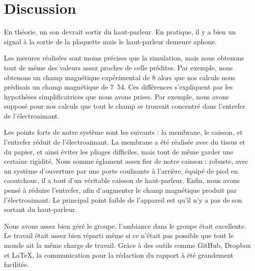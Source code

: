 

\section{Discussion}

En théorie, un son devrait sortir du haut-parleur.  En pratique, il y a bien un signal
à la sortie de la plaquette mais le haut-parleur demeure aphone. 

Les mesures réalisées sont moins précises que la simulation, mais nous obtenons tout de même 
des valeurs assez proches de celle prédites.  Par exemple, nous obtenons un champ magnétique
expérimental de \unit{8}{\centi\tesla} alors que nos calculs nous prédisais un champ magnétique de
\unit{7.54}{\centi\tesla}. Ces différences s'expliquent par les hypothèses simplificatrices
que nous avons prises. Par exemple, nous avons supposé pour nos calculs que tout le champ se trouvait 
concentré dans l'entrefer de l'électroaimant.

Les points forts de notre système sont les suivants : la membrane, le caisson, et l'entrefer réduit de l'électroaimant. 
La membrane a été réalisée avec du tissus et du papier, et ainsi éviter les pliages difficiles, mais tout de même garder 
une certaine rigidité. Nous somme églament assez fier de notre caisson : robuste, avec un système d'ouverture par une porte
coulisante à l'arrière, équipé de pied en caoutchouc, il a tout d'un véritable caisson de haut-parleur. Enfin, nous avons 
pensé à réduire l'entrefer, afin d'augmenter le champ magnétique produit par l'électroaimant. Le principal point faible de 
l'appareil est qu'il n'y a pas de son sortant du haut-parleur.

Nous avons assez bien géré le groupe, l'ambiance dans le groupe était excellente. Le travail était assez bien réparti
même si ce n'était pas possible que tout le monde ait la même charge de travail. Grâce à des outils comme GitHub, Dropbox et 
\LaTeX, la communication pour la rédaction du rapport à été grandement facilitée.


